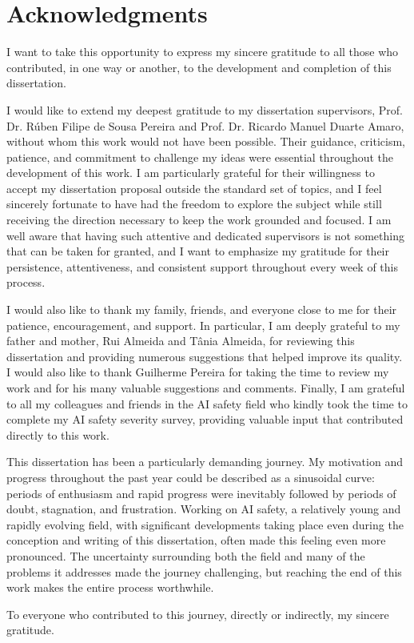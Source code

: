\chapter*{Acknowledgments}\label{acknowledgment}

I want to take this opportunity to express my sincere gratitude to all those who contributed, in one way or another, to the development and completion of this dissertation.

I would like to extend my deepest gratitude to my dissertation supervisors, Prof. Dr. Rúben Filipe de Sousa Pereira and Prof. Dr. Ricardo Manuel Duarte Amaro, without whom this work would not have been possible. Their guidance, criticism, patience, and commitment to challenge my ideas were essential throughout the development of this work. I am particularly grateful for their willingness to accept my dissertation proposal outside the standard set of topics, and I feel sincerely fortunate to have had the freedom to explore the subject while still receiving the direction necessary to keep the work grounded and focused. I am well aware that having such attentive and dedicated supervisors is not something that can be taken for granted, and I want to emphasize my gratitude for their persistence, attentiveness, and consistent support throughout every week of this process.

I would also like to thank my family, friends, and everyone close to me for their patience, encouragement, and support. In particular, I am deeply grateful to my father and mother, Rui Almeida and Tânia Almeida, for reviewing this dissertation and providing numerous suggestions that helped improve its quality. I would also like to thank Guilherme Pereira for taking the time to review my work and for his many valuable suggestions and comments. Finally, I am grateful to all my colleagues and friends in the AI safety field who kindly took the time to complete my AI safety severity survey, providing valuable input that contributed directly to this work.

This dissertation has been a particularly demanding journey. My motivation and progress throughout the past year could be described as a sinusoidal curve: periods of enthusiasm and rapid progress were inevitably followed by periods of doubt, stagnation, and frustration. Working on AI safety, a relatively young and rapidly evolving field, with significant developments taking place even during the conception and writing of this dissertation, often made this feeling even more pronounced. The uncertainty surrounding both the field and many of the problems it addresses made the journey challenging, but reaching the end of this work makes the entire process worthwhile.

To everyone who contributed to this journey, directly or indirectly, my sincere gratitude.
